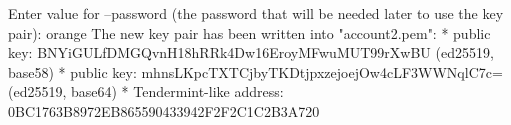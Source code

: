 \begin{shellbox}\begin{ttlst}
Enter value for --password (the password that will be needed later to use the key pair): orange
The new key pair has been written into "account2.pem":
* public key: BNYiGULfDMGQvnH18hRRk4Dw16EroyMFwuMUT99rXwBU (ed25519, base58)
* public key: mhnsLKpcTXTCjbyTKDtjpxzejoejOw4cLF3WWNqlC7c= (ed25519, base64)
* Tendermint-like address: 0BC1763B8972EB865590433942F2F2C1C2B3A720
\end{ttlst}\end{shellbox}
